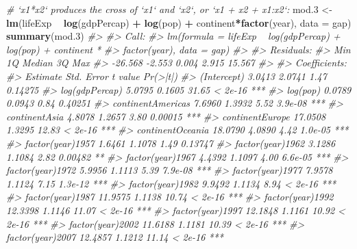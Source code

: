 \documentclass[
]{book}
\newenvironment{Shaded}{\begin{snugshade}}{\end{snugshade}}
\newcommand{\CommentTok}[1]{\textcolor[rgb]{0.56,0.35,0.01}{\textit{#1}}}
\newcommand{\DataTypeTok}[1]{\textcolor[rgb]{0.13,0.29,0.53}{#1}}
\newcommand{\FloatTok}[1]{\textcolor[rgb]{0.00,0.00,0.81}{#1}}
\newcommand{\KeywordTok}[1]{\textcolor[rgb]{0.13,0.29,0.53}{\textbf{#1}}}
\newcommand{\NormalTok}[1]{#1}
\newcommand{\OperatorTok}[1]{\textcolor[rgb]{0.81,0.36,0.00}{\textbf{#1}}}
\newcommand{\StringTok}[1]{\textcolor[rgb]{0.31,0.60,0.02}{#1}}
\begin{document}
\begin{Shaded}
\begin{Highlighting}[]
\CommentTok{# `x1*x2` produces the cross of `x1` and `x2`, or `x1 + x2 + x1:x2`:}
\NormalTok{mod}\FloatTok{.3}\NormalTok{ <-}\StringTok{ }\KeywordTok{lm}\NormalTok{(lifeExp }\OperatorTok{~}\StringTok{ }\KeywordTok{log}\NormalTok{(gdpPercap) }\OperatorTok{+}\StringTok{ }\KeywordTok{log}\NormalTok{(pop) }\OperatorTok{+}\StringTok{ }\NormalTok{continent}\OperatorTok{*}\KeywordTok{factor}\NormalTok{(year), }
            \DataTypeTok{data =}\NormalTok{ gap)}
\KeywordTok{summary}\NormalTok{(mod}\FloatTok{.3}\NormalTok{)}
\CommentTok{#> }
\CommentTok{#> Call:}
\CommentTok{#> lm(formula = lifeExp ~ log(gdpPercap) + log(pop) + continent * }
\CommentTok{#>     factor(year), data = gap)}
\CommentTok{#> }
\CommentTok{#> Residuals:}
\CommentTok{#>     Min      1Q  Median      3Q     Max }
\CommentTok{#> -26.568  -2.553   0.004   2.915  15.567 }
\CommentTok{#> }
\CommentTok{#> Coefficients:}
\CommentTok{#>                                    Estimate Std. Error t value Pr(>|t|)    }
\CommentTok{#> (Intercept)                          3.0413     2.0741    1.47  0.14275    }
\CommentTok{#> log(gdpPercap)                       5.0795     0.1605   31.65  < 2e-16 ***}
\CommentTok{#> log(pop)                             0.0789     0.0943    0.84  0.40251    }
\CommentTok{#> continentAmericas                    7.6960     1.3932    5.52  3.9e-08 ***}
\CommentTok{#> continentAsia                        4.8078     1.2657    3.80  0.00015 ***}
\CommentTok{#> continentEurope                     17.0508     1.3295   12.83  < 2e-16 ***}
\CommentTok{#> continentOceania                    18.0790     4.0890    4.42  1.0e-05 ***}
\CommentTok{#> factor(year)1957                     1.6461     1.1078    1.49  0.13747    }
\CommentTok{#> factor(year)1962                     3.1286     1.1084    2.82  0.00482 ** }
\CommentTok{#> factor(year)1967                     4.4392     1.1097    4.00  6.6e-05 ***}
\CommentTok{#> factor(year)1972                     5.9956     1.1113    5.39  7.9e-08 ***}
\CommentTok{#> factor(year)1977                     7.9578     1.1124    7.15  1.3e-12 ***}
\CommentTok{#> factor(year)1982                     9.9492     1.1134    8.94  < 2e-16 ***}
\CommentTok{#> factor(year)1987                    11.9575     1.1138   10.74  < 2e-16 ***}
\CommentTok{#> factor(year)1992                    12.3398     1.1146   11.07  < 2e-16 ***}
\CommentTok{#> factor(year)1997                    12.1848     1.1161   10.92  < 2e-16 ***}
\CommentTok{#> factor(year)2002                    11.6188     1.1181   10.39  < 2e-16 ***}
\CommentTok{#> factor(year)2007                    12.4857     1.1212   11.14  < 2e-16 ***}

\end{Highlighting}
\end{Shaded}
\end{document}
